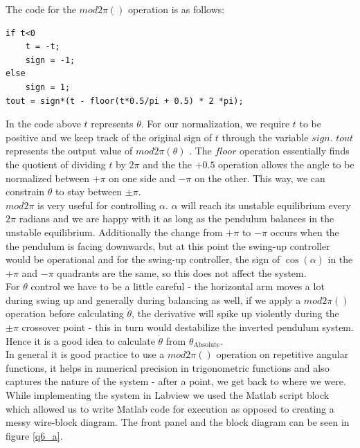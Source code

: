 \documentclass{article}
\theoremstyle{plain}
\theoremstyle{definition}
\theoremstyle{remark}
\begin{document}
The code for the $mod2\pi()$ operation is as follows:

\begin{verbatim}
if t<0
    t = -t;
    sign = -1;
else
    sign = 1;
tout = sign*(t - floor(t*0.5/pi + 0.5) * 2 *pi);
\end{verbatim}

In the code above $t$ represents $\theta$. For our normalization, we require $t$ to be positive and we keep track of the original sign of $t$ through the variable $sign$. $tout$ represents the output value of $mod2\pi(\theta)$ . The $floor$ operation essentially finds the quotient of dividing $t$ by $2\pi$ and the the $+ 0.5$ operation allows the angle to be normalized between $+\pi$ on one side and $-\pi$ on the other. This way, we can constrain $\theta$ to stay between $\pm \pi$.\\

$mod2\pi$ is very useful for controlling $\alpha$. $\alpha$ will reach its unstable equilibrium every $2\pi$ radians and we are happy with it as long as the pendulum balances in the unstable equilibrium. Additionally the change from $+\pi$ to $-\pi$ occurs when the the pendulum is facing downwards, but at this point the swing-up controller would be operational and for the swing-up controller, the sign of $\cos(\alpha)$ in the $+\pi$ and $-\pi$ quadrants are the same, so this does not affect the system.\\

For $\theta$ control we have to be a little careful - the horizontal arm moves a lot during swing up and generally during balancing as well, if we apply a $mod2\pi()$ operation before calculating $\dot{\theta}$, the derivative will spike up violently during the $\pm \pi$ crossover point - this in turn would destabilize the inverted pendulum system. Hence it is a good idea to calculate $\dot{\theta}$ from $\theta_{\text{Absolute}}$.\\

In general it is good practice to use a $mod2\pi()$ operation on repetitive angular functions, it helps in numerical precision in trigonometric functions and also captures the nature of the system - after a point, we get back to where we were.\\

While implementing the system in Labview we used the Matlab script block which allowed us to write Matlab code for execution as opposed to creating a messy wire-block diagram. The front panel and the block diagram can be seen in figure \ref{q6_a}.
\end{document}

